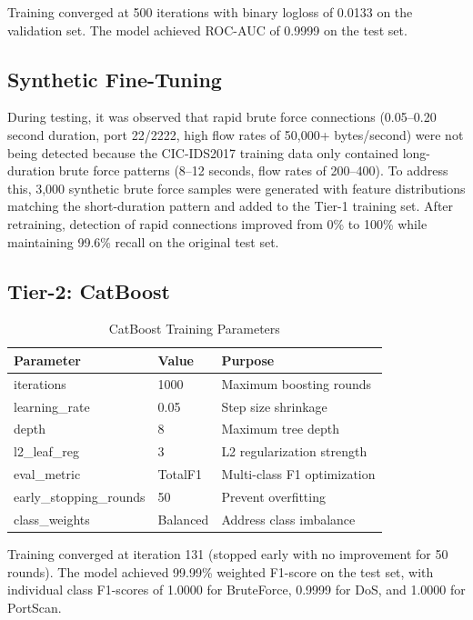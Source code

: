 \documentclass[12pt,a4paper,twoside]{report}
\begin{document}
Training converged at 500 iterations with binary logloss of 0.0133 on the validation set. The model achieved ROC-AUC of 0.9999 on the test set.

\subsection{Synthetic Fine-Tuning}

During testing, it was observed that rapid brute force connections (0.05--0.20 second duration, port 22/2222, high flow rates of 50,000+ bytes/second) were not being detected because the CIC-IDS2017 training data only contained long-duration brute force patterns (8--12 seconds, flow rates of 200--400). To address this, 3,000 synthetic brute force samples were generated with feature distributions matching the short-duration pattern and added to the Tier-1 training set. After retraining, detection of rapid connections improved from 0\% to 100\% while maintaining 99.6\% recall on the original test set.

\subsection{Tier-2: CatBoost}

\begin{table}[H]
\centering
\caption{CatBoost Training Parameters}
\begin{tabularx}{\textwidth}{llX}
\toprule
\textbf{Parameter} & \textbf{Value} & \textbf{Purpose} \\
\midrule
iterations & 1000 & Maximum boosting rounds \\
learning\_rate & 0.05 & Step size shrinkage \\
depth & 8 & Maximum tree depth \\
l2\_leaf\_reg & 3 & L2 regularization strength \\
eval\_metric & TotalF1 & Multi-class F1 optimization \\
early\_stopping\_rounds & 50 & Prevent overfitting \\
class\_weights & Balanced & Address class imbalance \\
\bottomrule
\end{tabularx}
\end{table}

Training converged at iteration 131 (stopped early with no improvement for 50 rounds). The model achieved 99.99\% weighted F1-score on the test set, with individual class F1-scores of 1.0000 for BruteForce, 0.9999 for DoS, and 1.0000 for PortScan.
\end{document}
